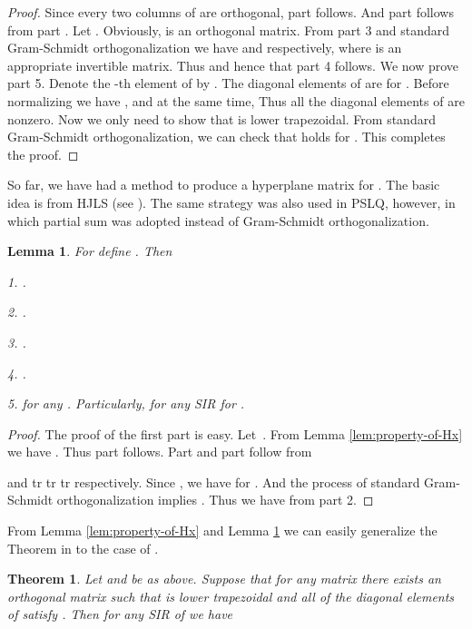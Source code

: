 \documentclass{sig-alternate}
\newtheorem{lem}[theorem]{Lemma}
\newtheorem{thm}[theorem]{Theorem}
\numberwithin{theorem}{section} \numberwithin{equation}{section}
\begin{document}
\begin{proof}
Since every two columns of  are orthogonal, part  follows.
And  part  follows from part . Let . Obviously,
 is an orthogonal
matrix. From part 3 and standard Gram-Schmidt orthogonalization we
have  and  respectively, where
 is an appropriate  invertible matrix. Thus  and hence that part 4 follows. We now
prove part 5. Denote the -th element of  by
. The diagonal elements of  are  for
. Before normalizing  we have , and at the same time,  Thus all the diagonal elements of  are nonzero. Now we only
need to show that  is lower trapezoidal. From standard
Gram-Schmidt orthogonalization, we can check that  holds for . This
completes the proof.
\end{proof}

So far, we have had a method to produce a hyperplane matrix 
for . The basic idea is from HJLS
(see \cite{HHL1986, HJL1989}). The same strategy was also used in
PSLQ, however, in which partial sum was adopted instead of
Gram-Schmidt orthogonalization.

\begin{lem}\label{lem:property-of-Px}
For  define . Then


1. .


2. .


3. .


4. .


5.  for any .
Particularly,  for any SIR
 for .
\end{lem}

\begin{proof}
The proof of the first part is easy. Let~. From Lemma \ref{lem:property-of-Hx}
we have
 . Thus part 
follows. Part  and part  follow from

and  tr tr
tr respectively. Since , we have  for . And the process of standard Gram-Schmidt
orthogonalization implies . Thus
we have  from part 2.
\end{proof}

From Lemma \ref{lem:property-of-Hx} and Lemma
\ref{lem:property-of-Px} we can easily generalize the Theorem  in
\cite{FBA1999} to the case of .

\begin{thm}\label{thm:lower-bound-of-simultaneous-relations}
Let  and  be as above. Suppose
that for any matrix  there exists an
orthogonal matrix  such that
 is lower trapezoidal and all of the diagonal
elements of  satisfy . Then for any SIR
 of  we have

\end{thm}
\end{document}
